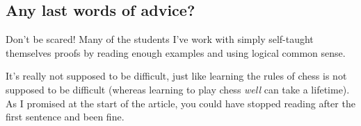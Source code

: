 \documentclass[11pt]{scrartcl}
\begin{document}
\subsection{Any last words of advice?}
Don't be scared!
Many of the students I've work with simply self-taught themselves
proofs by reading enough examples and using logical common sense.

It's really not supposed to be difficult,
just like learning the rules of chess is not supposed to be difficult
(whereas learning to play chess \emph{well} can take a lifetime).
As I promised at the start of the article,
you could have stopped reading after the first sentence and been fine.
\end{document}
